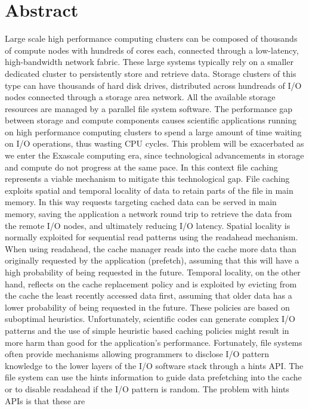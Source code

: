 \documentclass[a4paper,titlepage,oneside,10pt]{book}
\begin{document}
\chapter*{\centering \small Abstract}  
Large scale high performance computing clusters can be composed of thousands of compute nodes with hundreds of cores each, connected through a low-latency, high-bandwidth network fabric. These large systems typically 
rely on a smaller dedicated cluster to persistently store and retrieve data. Storage clusters of this type can have thousands of hard disk drives, distributed across hundreads of I/O nodes connected through a storage 
area network. All the available storage resources are managed by a parallel file system software. The performance gap between storage and compute components causes scientific applications running on high performance 
computing clusters to spend a large amount of time waiting on I/O operations, thus wasting CPU cycles. This problem will be exacerbated as we enter the Exascale computing era, since technological advancements in storage
and compute do not progress at the same pace. In this context file caching represents a viable mechanism to mitigate this technological gap. File caching exploits spatial and temporal locality of data to retain parts 
of the file in main memory. In this way requests targeting cached data can be served in main memory, saving the application a network round trip to retrieve the data from the remote I/O nodes, and ultimately reducing I/O 
latency. Spatial locality is normally exploited for sequential read patterns using the readahead mechanism. When using readahead, the cache manager reads into the cache more data than originally requested by the application 
(prefetch), assuming that this will have a high probability of being requested in the future. Temporal locality, on the other hand, reflects on the cache replacement policy and is exploited by evicting from the cache the least recently accessed data 
first, assuming that older data has a lower probability of being requested in the future. These policies are based on suboptimal heuristics. Unfortunately, scientific codes can generate complex I/O patterns and the use of simple heuristic 
based caching policies might result in more harm than good for the application's performance. Fortunately, file systems often provide mechanisms allowing programmers to disclose I/O pattern knowledge to the lower layers of the 
I/O software stack through a hints API. The file system can use the hints information to guide data prefetching into the cache or to disable readahead if the I/O pattern is random. The problem with hints APIs is that these are 
\end{document}
